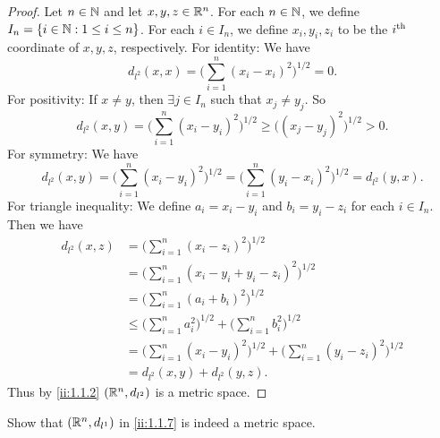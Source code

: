 \begin{proof}
  Let \(n \in \mathbb{N}\) and let \(x, y, z \in \mathbb{R}^n\).
  For each \(n \in \mathbb{N}\), we define \(I_n = \left\lbrace i \in \mathbb{N} : 1 \leq i \leq n\right\rbrace\).
  For each \(i \in I_n\), we define \(x_i, y_i, z_i\) to be the \(i^{\operatorname{th}}\) coordinate of \(x, y, z\), respectively.
  For identity:
  We have
  \[
    d_{l^2}(x, x) = \bigg(\sum_{i = 1}^n (x_i - x_i)^2\bigg)^{1 / 2} = 0.
  \]
  For positivity:
  If \(x \neq y\), then \(\exists j \in I_n\) such that \(x_j \neq y_j\).
  So
  \[
    d_{l^2}(x, y) = \bigg(\sum_{i = 1}^n (x_i - y_i)^2\bigg)^{1 / 2} \geq \big((x_j - y_j)^2\big)^{1 / 2} > 0.
  \]
  For symmetry:
  We have
  \[
    d_{l^2}(x, y) = \bigg(\sum_{i = 1}^n (x_i - y_i)^2\bigg)^{1 / 2} = \bigg(\sum_{i = 1}^n (y_i - x_i)^2\bigg)^{1 / 2} = d_{l^2}(y, x).
  \]
  For triangle inequality:
  We define \(a_i = x_i - y_i\) and \(b_i = y_i - z_i\) for each \(i \in I_n\).
  Then we have
  \begin{align*}
    d_{l^2}(x, z) & = \bigg(\sum_{i = 1}^n (x_i - z_i)^2\bigg)^{1 / 2}                                                    \\
                  & = \bigg(\sum_{i = 1}^n (x_i - y_i + y_i - z_i)^2\bigg)^{1 / 2}                                        \\
                  & = \bigg(\sum_{i = 1}^n (a_i + b_i)^2\bigg)^{1 / 2}                                                    \\
                  & \leq \bigg(\sum_{i = 1}^n a_i^2\bigg)^{1 / 2} + \bigg(\sum_{i = 1}^n b_i^2\bigg)^{1 / 2}              \\
                  & = \bigg(\sum_{i = 1}^n (x_i - y_i)^2\bigg)^{1 / 2} + \bigg(\sum_{i = 1}^n (y_i - z_i)^2\bigg)^{1 / 2} \\
                  & = d_{l^2}(x, y) + d_{l^2}(y, z).
  \end{align*}
  Thus by \cref{ii:1.1.2} \((\mathbb{R}^n, d_{l^2})\) is a metric space.
\end{proof}

\begin{ex}\label{ii:ex:1.1.7}
  Show that \((\mathbb{R}^n, d_{l^1})\) in \cref{ii:1.1.7} is indeed a metric space.
\end{ex}


